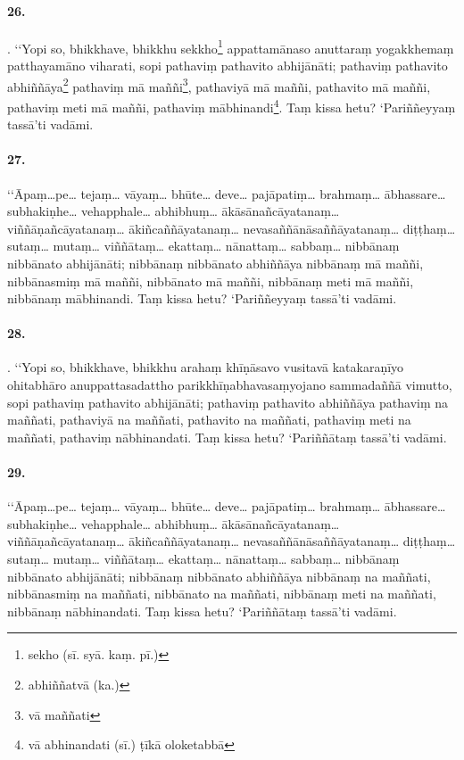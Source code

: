 
\paragraph{26.} . ‘‘Yopi so, bhikkhave, bhikkhu sekkho\footnote{sekho (sī. syā. kaṃ. pī.)} appattamānaso anuttaraṃ yogakkhemaṃ patthayamāno viharati, sopi pathaviṃ pathavito abhijānāti; pathaviṃ pathavito abhiññāya\footnote{abhiññatvā (ka.)} pathaviṃ mā maññi\footnote{vā maññati}, pathaviyā mā maññi, pathavito mā maññi, pathaviṃ meti mā maññi, pathaviṃ mābhinandi\footnote{vā abhinandati (sī.) ṭīkā oloketabbā}. Taṃ kissa hetu? ‘Pariññeyyaṃ tassā’ti vadāmi.

\paragraph{27.} ‘‘Āpaṃ…pe… tejaṃ… vāyaṃ… bhūte… deve… pajāpatiṃ… brahmaṃ… ābhassare… subhakiṇhe… vehapphale… abhibhuṃ… ākāsānañcāyatanaṃ… viññāṇañcāyatanaṃ… ākiñcaññāyatanaṃ… nevasaññānāsaññāyatanaṃ… diṭṭhaṃ… sutaṃ… mutaṃ… viññātaṃ… ekattaṃ… nānattaṃ… sabbaṃ… nibbānaṃ nibbānato abhijānāti; nibbānaṃ nibbānato abhiññāya nibbānaṃ mā maññi, nibbānasmiṃ mā maññi, nibbānato mā maññi, nibbānaṃ meti mā maññi, nibbānaṃ mābhinandi. Taṃ kissa hetu? ‘Pariññeyyaṃ tassā’ti vadāmi.


\paragraph{28.} . ‘‘Yopi so, bhikkhave, bhikkhu arahaṃ khīṇāsavo vusitavā katakaraṇīyo ohitabhāro anuppattasadattho parikkhīṇabhavasaṃyojano sammadaññā vimutto, sopi pathaviṃ pathavito abhijānāti; pathaviṃ pathavito abhiññāya pathaviṃ na maññati, pathaviyā na maññati, pathavito na maññati, pathaviṃ meti na maññati, pathaviṃ nābhinandati. Taṃ kissa hetu? ‘Pariññātaṃ tassā’ti vadāmi.

\paragraph{29.} ‘‘Āpaṃ…pe… tejaṃ… vāyaṃ… bhūte… deve… pajāpatiṃ… brahmaṃ… ābhassare… subhakiṇhe… vehapphale… abhibhuṃ… ākāsānañcāyatanaṃ… viññāṇañcāyatanaṃ… ākiñcaññāyatanaṃ… nevasaññānāsaññāyatanaṃ… diṭṭhaṃ… sutaṃ… mutaṃ… viññātaṃ… ekattaṃ… nānattaṃ… sabbaṃ… nibbānaṃ nibbānato abhijānāti; nibbānaṃ nibbānato abhiññāya nibbānaṃ na maññati, nibbānasmiṃ na maññati, nibbānato na maññati, nibbānaṃ meti na maññati, nibbānaṃ nābhinandati. Taṃ kissa hetu? ‘Pariññātaṃ tassā’ti vadāmi.


